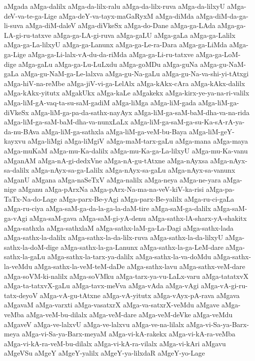 {aMgada
aMga-dalilx
aMga-da-lilx-ralu
aMga-da-lilx-ruva
aMga-da-lilxyU
aMga-deV-va-te-ga-Lige
aMga-deY-va-tayx-maGaRyxM
aMga-diMda
aMga-diM-da-ga-li-suva
aMga-diM-daleV
aMga-diVkeSx
aMga-do-Dane
aMga-ga-LAda
aMga-ga-LA-gi-ru-tatxve
aMga-ga-LA-gi-ruva
aMga-gaLU
aMga-gaLa
aMga-ga-Lalilx
aMga-ga-La-lilxyU
aMga-ga-Lanunx
aMga-ga-Le-ra-Dara
aMga-ga-LiMda
aMga-ga-Lige
aMga-ga-Li-lalx-vA-du-da-riMda
aMga-ga-Li-ru-tatxve
aMga-ga-LoM-dige
aMga-gaLu
aMga-ga-Lu-LuLxdu
aMga-goMDu
aMga-guNa
aMga-gu-NaM-gaLa
aMga-gu-NaM-ga-Le-lalxva
aMga-gu-Na-gaLu
aMga-gu-Na-va-shi-yi-tAtxgi
aMga-hiV-na-reMbe
aMga-jiV-vi-ga-LelAlx
aMga-kAkx-cAra
aMga-kAkx-dalilx
aMga-kAkx-yitutx
aMgakUkx
aMga-kaLe
aMgakekx
aMga-kirx-ye-ya-na-ri-valilx
aMga-liM-gA-vaq-ta-su-saM-gadiM
aMga-liMga
aMga-liM-gada
aMga-liM-ga-diVkeSx
aMga-liM-ga-pa-da-sathx-nayAyx
aMga-liM-ga-saM-baM-dha-va-na-rida
aMga-liM-ga-saM-baM-dha-va-nunxLaLx
aMga-liM-ga-saM-ga-su-Ka-sA-rA-ya-da-nu-BAva
aMga-liM-ga-sathxla
aMga-liM-ga-veM-bu-Baya
aMga-liM-geY-kayxvu
aMga-liMgi
aMga-liMgiV
aMga-maM-tarx-gaLu
aMga-mana
aMga-maya
aMga-muKaM
aMga-mu-Ka-dalilx
aMga-mu-Ka-ga-La-lilxyU
aMga-mu-Ka-vanu
aMganAM
aMga-nA-gi-dedxVne
aMga-nA-gu-tAtxne
aMga-nAyxsa
aMga-nAyx-sa-dalilx
aMga-nAyx-sa-ga-Lalilx
aMga-nAyx-sa-gaLu
aMga-nAyx-sa-vanunx
aMganU
aMgana
aMga-naSeTxV
aMga-nalilx
aMga-neya
aMga-ne-yara
aMga-nige
aMganu
aMga-pArxNa
aMga-pArx-Na-ma-na-veV-kiV-ka-risi
aMga-pa-TaTx-Na-do-Lage
aMga-parx-Be-yAgi
aMga-parx-Be-yalilx
aMga-ru-ci-gaLa
aMga-ru-ciya
aMga-saM-ga-da-la-ga-la-daM-tire
aMga-saM-ga-dalilx
aMga-saM-ga-vAgi
aMga-saM-gava
aMga-saM-gi-yA-denu
aMga-sathx-lA-sharx-yA-shakitx
aMga-sathxla
aMga-sathxlaM
aMga-sathx-laM-ga-La-Dagi
aMga-sathx-lada
aMga-sathx-la-dalilx
aMga-sathx-la-da-lilx-ruva
aMga-sathx-la-da-lilxyU
aMga-sathx-la-doM-dige
aMga-sathx-la-ga-Lanunx
aMga-sathx-la-ga-LeM-dare
aMga-sathx-la-gaLu
aMga-sathx-la-tarx-ya-dalilx
aMga-sathx-la-va-doMdu
aMga-sathx-la-veMdu
aMga-sathx-la-veM-teM-daDe
aMga-sathx-lavu
aMga-sathx-veM-dare
aMga-soVM-ki-nalilx
aMga-soVMku
aMga-tarx-ya-vu-LaLx-varu
aMga-tatatxvX
aMga-ta-tatxvX-gaLu
aMga-tavx-meVva
aMga-vAda
aMga-vAgi
aMga-vA-gi-ru-tatx-deyoV
aMga-vA-gu-tAtxne
aMga-vA-yitutx
aMga-vAyx-pA-rava
aMgava
aMgavaM
aMga-varxti
aMga-vasatxrX
aMga-va-satxrX-veMdu
aMgave
aMga-veMba
aMga-veM-bu-dilalx
aMga-veM-dare
aMga-veM-deVke
aMga-veMdu
aMgaveV
aMga-ve-lalxvU
aMga-ve-lalxvu
aMga-ve-na-lilalx
aMga-vi-Sa-ya-Barx-meya
aMga-vi-Sa-ya-Barx-meyaM
aMga-vi-kA-rakekx
aMga-vi-kA-ra-veMba
aMga-vi-kA-ra-veM-bu-dilalx
aMga-vi-kA-ra-vilalx
aMga-vi-kAri
aMgavu
aMgeVSu
aMgeY
aMgeY-yalilx
aMgeY-ya-lilxdaR
aMgeY-yo-Lage
}
